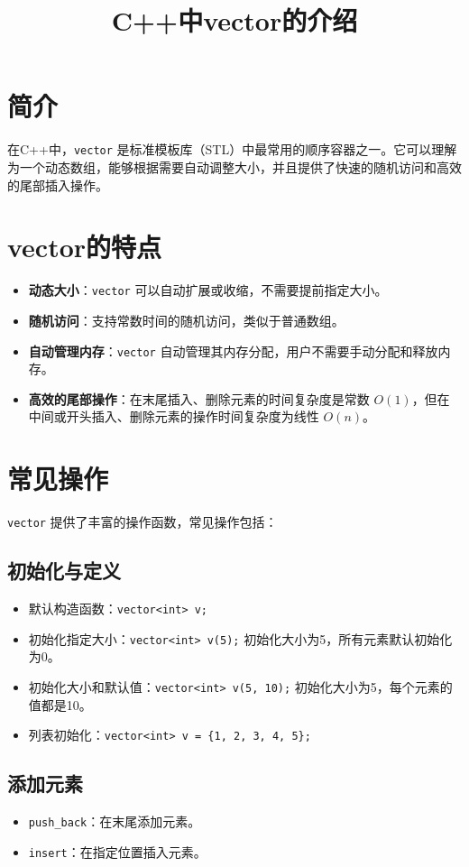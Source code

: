 \documentclass{article}
\title{C++中vector的介绍}
\author{}
\date{}
\begin{document}
\maketitle

\section{简介}
在C++中，\texttt{vector} 是标准模板库（STL）中最常用的顺序容器之一。它可以理解为一个动态数组，能够根据需要自动调整大小，并且提供了快速的随机访问和高效的尾部插入操作。

\section{vector的特点}
\begin{itemize}
    \item \textbf{动态大小}：\texttt{vector} 可以自动扩展或收缩，不需要提前指定大小。
    \item \textbf{随机访问}：支持常数时间的随机访问，类似于普通数组。
    \item \textbf{自动管理内存}：\texttt{vector} 自动管理其内存分配，用户不需要手动分配和释放内存。
    \item \textbf{高效的尾部操作}：在末尾插入、删除元素的时间复杂度是常数 \(O(1)\)，但在中间或开头插入、删除元素的操作时间复杂度为线性 \(O(n)\)。
\end{itemize}

\section{常见操作}
\texttt{vector} 提供了丰富的操作函数，常见操作包括：

\subsection{初始化与定义}
\begin{itemize}
    \item 默认构造函数：\texttt{vector<int> v;}
    \item 初始化指定大小：\texttt{vector<int> v(5);} 初始化大小为5，所有元素默认初始化为0。
    \item 初始化大小和默认值：\texttt{vector<int> v(5, 10);} 初始化大小为5，每个元素的值都是10。
    \item 列表初始化：\texttt{vector<int> v = \{1, 2, 3, 4, 5\};}
\end{itemize}

\subsection{添加元素}
\begin{itemize}
    \item \texttt{push\_back}：在末尾添加元素。
    \item \texttt{insert}：在指定位置插入元素。
\end{itemize}
\end{document}

